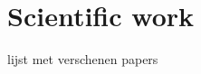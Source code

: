 \section[]{Scientific work}

lijst met verschenen papers
% 
% 
% 
% 
% 
% 
% 
% 
% 
% 
% 
% 
% 
% 
% 
% 
% 
% 
% 
% 

